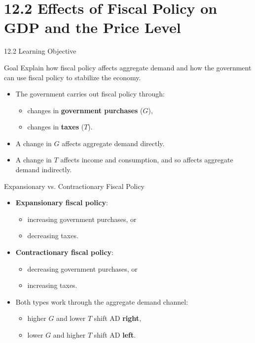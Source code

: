 \documentclass[aspectratio=169]{beamer}
\begin{document}
\section{12.2 Effects of Fiscal Policy on GDP and the Price Level}

\begin{frame}{12.2 Learning Objective}
\transfade
\begin{block}{Goal}
Explain how fiscal policy affects aggregate demand and how the government can use fiscal policy to stabilize the economy.
\end{block}
\begin{itemize}[<+->]
  \item The government carries out fiscal policy through:
  \begin{itemize}[<+->]
    \item changes in \textbf{government purchases} (\(G\)),
    \item changes in \textbf{taxes} (\(T\)).
  \end{itemize}
  \item A change in \(G\) affects aggregate demand \alert{directly}.
  \item A change in \(T\) affects income and consumption, and so affects aggregate demand \alert{indirectly}.
\end{itemize}
\end{frame}

\begin{frame}{Expansionary vs. Contractionary Fiscal Policy}
\transfade
\begin{itemize}[<+->]
  \item \textbf{Expansionary fiscal policy}:
  \begin{itemize}[<+->]
    \item increasing government purchases, or
    \item decreasing taxes.
  \end{itemize}
  \item \textbf{Contractionary fiscal policy}:
  \begin{itemize}[<+->]
    \item decreasing government purchases, or
    \item increasing taxes.
  \end{itemize}
  \item Both types work through the aggregate demand channel:
  \begin{itemize}[<+->]
    \item higher \(G\) and lower \(T\) shift AD \textbf{right},
    \item lower \(G\) and higher \(T\) shift AD \textbf{left}.
  \end{itemize}
\end{itemize}
\end{frame}
\end{document}
